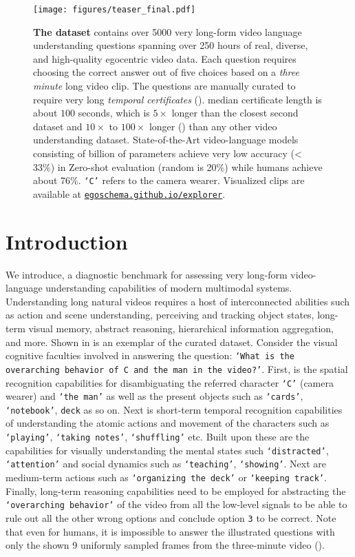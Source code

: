 \begin{figure}[h!]
    \centering
    \texttt{[image: figures/teaser\_final.pdf]}
    \caption{\textbf{The \name{}{} dataset} contains over 5000 very long-form video language understanding questions spanning over 250 hours of real, diverse, and high-quality egocentric video data. Each question requires choosing the correct answer out of five choices based on a \textit{three minute} long video clip. The questions are manually curated to require very long \textit{temporal certificates} (). \name{}{} median certificate length is about $100$ seconds, which is $5\times$ longer than the closest second dataset and $10\times$ to $100\times$ longer () than any other video understanding dataset. State-of-the-Art video-language models consisting of billion of parameters achieve very low accuracy (< 33\%) in Zero-shot evaluation (random is 20\%) while humans achieve about 76\%. \texttt{`C'} refers to the camera wearer. Visualized clips are available at \href{http://egoschema.github.io/explorer.html}{\texttt{egoschema.github.io/explorer}}.}
    \label{fig:bigteaser}
\end{figure}
\section{Introduction}

We introduce\name{}{}, a diagnostic benchmark for assessing very long-form video-language understanding capabilities of modern multimodal systems. 
Understanding long natural videos requires a host of interconnected abilities such as action and scene understanding, perceiving and tracking object states, long-term visual memory, abstract reasoning, hierarchical information aggregation, and more. Shown in  is an exemplar of the curated\name{}{} dataset. Consider the visual cognitive faculties involved in answering the question: \texttt{`What is the overarching behavior of C and the man in the video?'}. First, is the spatial recognition capabilities for disambiguating the referred character \texttt{`C'} (camera wearer) and \texttt{`the man'} as well as the present objects such as \texttt{`cards'}, \texttt{`notebook'}, \texttt{deck} as so on. Next is short-term temporal recognition capabilities of understanding the atomic actions and movement of the characters such as \texttt{`playing'}, \texttt{`taking notes'}, \texttt{`shuffling'} etc. Built upon these are the capabilities for visually understanding the mental states such \texttt{`distracted'}, \texttt{`attention'} and social dynamics such as \texttt{`teaching'}, \texttt{`showing'}. Next are medium-term actions such as \texttt{`organizing the deck'} or \texttt{`keeping track'}. Finally, long-term reasoning capabilities need to be employed for abstracting the \texttt{`overarching behavior'} of the video from all the low-level signals to be able to rule out all the other wrong options and conclude option \texttt{3} to be correct. Note that even for humans, it is impossible to answer the illustrated questions with only the shown 9 uniformly sampled frames from the three-minute video ().             

